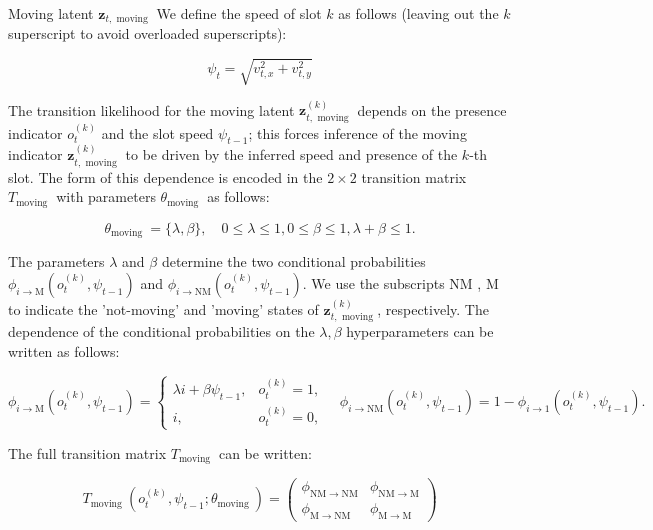 \documentclass[10pt]{article}
\begin{document}
Moving latent $\mathbf{z}_{t, \text { moving }}$ We define the speed of slot $k$ as follows (leaving out the $k$ superscript to avoid overloaded superscripts):


\begin{equation*}
\psi_{t}=\sqrt{v_{t, x}^{2}+v_{t, y}^{2}} \tag{18}
\end{equation*}


The transition likelihood for the moving latent $\mathbf{z}_{t, \text { moving }}^{(k)}$ depends on the presence indicator $o_{t}^{(k)}$ and the slot speed $\psi_{t-1}$; this forces inference of the moving indicator $\mathbf{z}_{t, \text { moving }}^{(k)}$ to be driven by the inferred speed and presence of the $k$-th slot. The form of this dependence is encoded in the $2 \times 2$ transition matrix $T_{\text {moving }}$ with parameters $\theta_{\text {moving }}$ as follows:


\begin{equation*}
\theta_{\text {moving }}=\{\lambda, \beta\}, \quad 0 \leq \lambda \leq 1,0 \leq \beta \leq 1, \lambda+\beta \leq 1 . \tag{19}
\end{equation*}


The parameters $\lambda$ and $\beta$ determine the two conditional probabilities $\phi_{i \rightarrow \mathrm{M}}\left(o_{t}^{(k)}, \psi_{t-1}\right)$ and $\phi_{i \rightarrow \mathrm{NM}}\left(o_{t}^{(k)}, \psi_{t-1}\right)$. We use the subscripts NM , M to indicate the 'not-moving' and 'moving' states of $\mathbf{z}_{t, \text { moving }}^{(k)}$, respectively. The dependence of the conditional probabilities on the $\lambda, \beta$ hyperparameters can be written as follows:

$$
\phi_{i \rightarrow \mathrm{M}}\left(o_{t}^{(k)}, \psi_{t-1}\right)=\left\{\begin{array}{ll}
\lambda i+\beta \psi_{t-1}, & o_{t}^{(k)}=1, \\
i, & o_{t}^{(k)}=0,
\end{array} \quad \phi_{i \rightarrow \mathrm{NM}}\left(o_{t}^{(k)}, \psi_{t-1}\right)=1-\phi_{i \rightarrow 1}\left(o_{t}^{(k)}, \psi_{t-1}\right) .\right.
$$

The full transition matrix $T_{\text {moving }}$ can be written:

\[
T_{\text {moving }}\left(o_{t}^{(k)}, \psi_{t-1} ; \theta_{\text {moving }}\right)=\left(\begin{array}{cc}
\phi_{\mathrm{NM} \rightarrow \mathrm{NM}} & \phi_{\mathrm{NM} \rightarrow \mathrm{M}}  \tag{20}\\
\phi_{\mathrm{M} \rightarrow \mathrm{NM}} & \phi_{\mathrm{M} \rightarrow \mathrm{M}}
\end{array}\right)
\]
\end{document}
